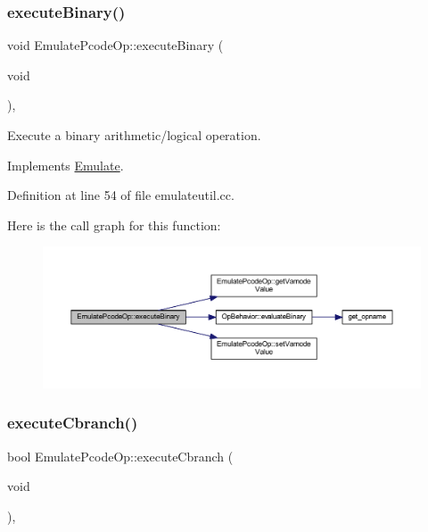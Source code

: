 \subsubsection{\texorpdfstring{executeBinary()}{executeBinary()}}
{\footnotesize\ttfamily void Emulate\+Pcode\+Op\+::execute\+Binary (\begin{DoxyParamCaption}\item[{void}]{ }\end{DoxyParamCaption})\hspace{0.3cm}{\ttfamily [protected]}, {\ttfamily [virtual]}}



Execute a binary arithmetic/logical operation. 



Implements \mbox{\hyperlink{class_emulate_a278171740465666a64442716187a1505}{Emulate}}.



Definition at line 54 of file emulateutil.\+cc.

Here is the call graph for this function\+:
\nopagebreak
\begin{figure}[H]
\begin{center}
\leavevmode
\includegraphics[width=350pt]{class_emulate_pcode_op_ac33f956b6cf8b205b32324d0a84b38cb_cgraph}
\end{center}
\end{figure}
\mbox{\label{class_emulate_pcode_op_a5aa70550f3f75829976b082a87d50d8f}} 
\subsubsection{\texorpdfstring{executeCbranch()}{executeCbranch()}}
{\footnotesize\ttfamily bool Emulate\+Pcode\+Op\+::execute\+Cbranch (\begin{DoxyParamCaption}\item[{void}]{ }\end{DoxyParamCaption})\hspace{0.3cm}{\ttfamily [protected]}, {\ttfamily [virtual]}}



